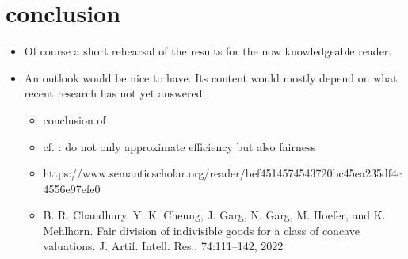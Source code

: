 \section{conclusion}
\label{sec:conclusion}

\begin{itemize}
	\item
	Of course a short rehearsal of the results for the now knowledgeable reader.

	\item
	An outlook would be nice to have.
	Its content would mostly depend on what recent research has not yet answered.
	\begin{itemize}
		\item
		conclusion of \cite{min_envy_and_max_avg_nsw_in_the_alloc_of_indiv_goods}

		\item
		cf. \cite{min_envy_and_max_avg_nsw_in_the_alloc_of_indiv_goods}: do not only approximate efficiency but also fairness

		\item
		https://www.semanticscholar.org/reader/bef4514574543720bc45ea235df4c4556e97efe0

		\item
		B. R. Chaudhury, Y. K. Cheung, J. Garg, N. Garg, M. Hoefer, and K. Mehlhorn. Fair division
		of indivisible goods for a class of concave valuations. J. Artif. Intell. Res., 74:111–142, 2022
	\end{itemize}
\end{itemize}

\lipsum[1-5]
